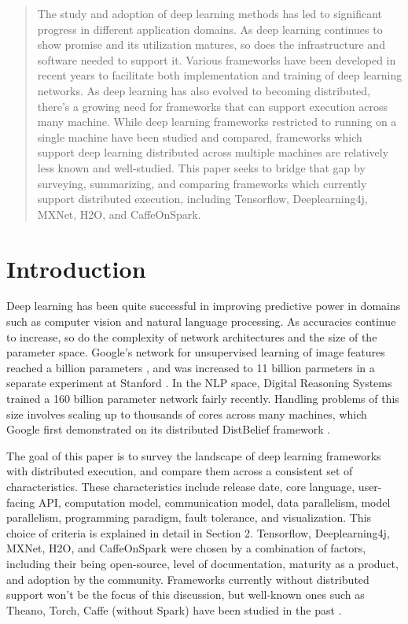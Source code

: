 \documentclass{article}
\begin{document}
\begin{abstract}
The study and adoption of deep learning methods has led to significant progress in different application domains. As deep learning continues to show promise and its utilization matures, so does the infrastructure and software needed to support it. Various frameworks have been developed in recent years to facilitate both implementation and training of deep learning networks. As deep learning has also evolved to becoming distributed, there's a growing need for frameworks that can support execution across many machine. While deep learning frameworks restricted to running on a single machine have been studied and compared, frameworks which support deep learning distributed across multiple machines are relatively less known and well-studied. This paper seeks to bridge that gap by surveying, summarizing, and comparing frameworks which currently support distributed execution, including Tensorflow, Deeplearning4j, MXNet, H2O, and CaffeOnSpark. 
\end{abstract}

\section{Introduction}
Deep learning has been quite successful in improving predictive power in domains such as computer vision and natural language processing. As accuracies continue to  increase, so do the complexity of network architectures and the size of the parameter space. Google's network for unsupervised learning of image features reached a billion parameters \cite{donahue2014decaf}, and was increased to 11 billion parmeters in a separate experiment at Stanford \cite{schmidhuber2015deep}. In the NLP space, Digital Reasoning Systems trained a 160 billion parameter network \cite{trask2015modeling} fairly recently. Handling problems of this size involves scaling up to thousands of cores across many machines, which Google first demonstrated on its distributed DistBelief framework \cite{dean2012large}.

The goal of this paper is to survey the landscape of deep learning frameworks with distributed execution, and compare them across a consistent set of characteristics. These characteristics include release date, core language, user-facing API, computation model, communication model, data parallelism, model parallelism, programming paradigm, fault tolerance, and visualization. This choice of criteria is explained in detail in Section 2. Tensorflow, Deeplearning4j, MXNet, H2O, and CaffeOnSpark were chosen by a combination of factors, including their being open-source, level of documentation, maturity as a product, and adoption by the community. Frameworks currently without distributed support won't be the focus of this discussion, but well-known ones such as Theano, Torch, Caffe (without Spark) have been studied in the past \cite{DBLP:journals/corr/BahrampourRSS15}. 
\end{document}

